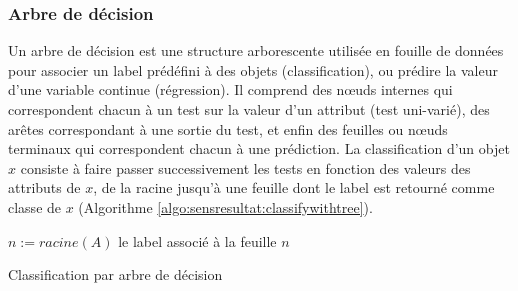 \subsubsection{Arbre de décision}
Un arbre de décision est une structure arborescente utilisée en fouille de données pour associer un label prédéfini à des objets (classification), ou prédire la valeur d'une variable continue (régression). Il comprend des n\oe{}uds internes qui correspondent chacun à un test sur la valeur d'un attribut (test uni-varié), des arêtes correspondant à une sortie du test, et enfin des feuilles ou n\oe{}uds terminaux qui correspondent chacun à une prédiction. La classification d'un objet $x$ consiste à faire passer successivement les tests en fonction des valeurs des attributs de $x$, de la racine jusqu'à une feuille dont le label est retourné comme classe de $x$ (Algorithme \ref{algo:sensresultat:classifywithtree}).

\begin{algorithm}[ht] \small
	$n := racine(A)$ \; 
	\Return le label associé à la feuille $n$\;
	\caption{Classification par arbre de décision} \label{algo:sensresultat:classifywithtree}
\end{algorithm}

